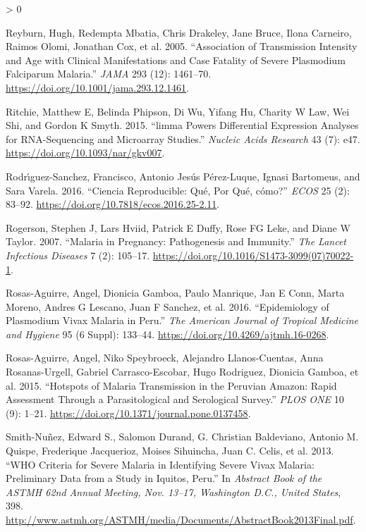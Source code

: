 \documentclass[
  a4paper]{article}
\newlength{\cslhangindent}
\newenvironment{CSLReferences}[2] %
 {%
  \setlength{\parindent}{0pt}
  \ifodd #1 \everypar{\setlength{\hangindent}{\cslhangindent}}\ignorespaces\fi
  \ifnum #2 > 0
  \setlength{\parskip}{#2\baselineskip}
  \fi
 }%
 {}
\begin{document}
\begin{CSLReferences}{1}{0}
\leavevmode\hypertarget{ref-reyburn2015}{}%
Reyburn, Hugh, Redempta Mbatia, Chris Drakeley, Jane Bruce, Ilona
Carneiro, Raimos Olomi, Jonathan Cox, et al. 2005. {``Association of
Transmission Intensity and Age with Clinical Manifestations and Case
Fatality of Severe Plasmodium Falciparum Malaria.''} \emph{JAMA} 293
(12): 1461--70. \url{https://doi.org/10.1001/jama.293.12.1461}.

\leavevmode\hypertarget{ref-limma}{}%
Ritchie, Matthew E, Belinda Phipson, Di Wu, Yifang Hu, Charity W Law,
Wei Shi, and Gordon K Smyth. 2015. {``{limma} Powers Differential
Expression Analyses for {RNA}-Sequencing and Microarray Studies.''}
\emph{Nucleic Acids Research} 43 (7): e47.
\url{https://doi.org/10.1093/nar/gkv007}.

\leavevmode\hypertarget{ref-CienciaReproducible2016}{}%
Rodrı́guez-Sanchez, Francisco, Antonio Jesús Pérez-Luque, Ignasi
Bartomeus, and Sara Varela. 2016. {``Ciencia Reproducible: {{}}Qu{é},
Por Qu{é}, c{ó}mo?''} \emph{{ECOS}} 25 (2): 83--92.
\url{https://doi.org/10.7818/ecos.2016.25-2.11}.

\leavevmode\hypertarget{ref-rogerson2007preg}{}%
Rogerson, Stephen J, Lars Hviid, Patrick E Duffy, Rose FG Leke, and
Diane W Taylor. 2007. {``Malaria in Pregnancy: Pathogenesis and
Immunity.''} \emph{The Lancet Infectious Diseases} 7 (2): 105--17.
\url{https://doi.org/10.1016/S1473-3099(07)70022-1}.

\leavevmode\hypertarget{ref-rosas2016peru}{}%
Rosas-Aguirre, Angel, Dionicia Gamboa, Paulo Manrique, Jan E Conn, Marta
Moreno, Andres G Lescano, Juan F Sanchez, et al. 2016. {``Epidemiology
of Plasmodium Vivax Malaria in {Peru}.''} \emph{The American Journal of
Tropical Medicine and Hygiene} 95 (6 Suppl): 133--44.
\url{https://doi.org/10.4269/ajtmh.16-0268}.

\leavevmode\hypertarget{ref-hotspots2015}{}%
Rosas-Aguirre, Angel, Niko Speybroeck, Alejandro Llanos-Cuentas, Anna
Rosanas-Urgell, Gabriel Carrasco-Escobar, Hugo Rodriguez, Dionicia
Gamboa, et al. 2015. {``Hotspots of Malaria Transmission in the
{Peruvian Amazon}: Rapid Assessment Through a Parasitological and
Serological Survey.''} \emph{PLOS ONE} 10 (9): 1--21.
\url{https://doi.org/10.1371/journal.pone.0137458}.

\leavevmode\hypertarget{ref-smith2013}{}%
Smith-Nuñez, Edward S., Salomon Durand, G. Christian Baldeviano, Antonio
M. Quispe, Frederique Jacquerioz, Moises Sihuincha, Juan C. Celis, et
al. 2013. {``WHO Criteria for Severe Malaria in Identifying Severe Vivax
Malaria: Preliminary Data from a Study in {Iquitos}, {Peru}.''} In
\emph{Abstract Book of the ASTMH 62nd Annual Meeting, Nov. 13--17,
Washington {D.C.}, United States}, 398.
\url{http://www.astmh.org/ASTMH/media/Documents/AbstractBook2013Final.pdf}.


\end{CSLReferences}
\end{document}
